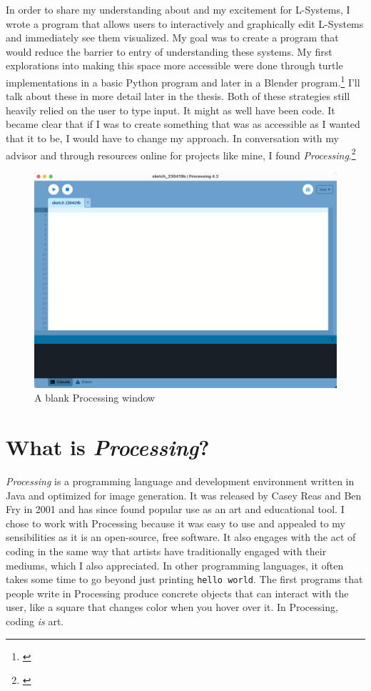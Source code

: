 \documentclass[12pt,twoside]{reedthesis}
\newcommand{\code}[1]{\texttt{#1}}
\begin{document}
	In order to share my understanding about and my excitement for L-Systems, I wrote a program that allows users to interactively and graphically edit L-Systems and immediately see them visualized. My goal was to create a program that would reduce the barrier to entry of understanding these systems. My first explorations into making this space more accessible were done through turtle implementations in a basic Python program and later in a Blender program.\footnote{\cite{Blender2018}} I'll talk about these in more detail later in the thesis. Both of these strategies still heavily relied on the user to type input. It might as well have been code. It became clear that if I was to create something that was as accessible as I wanted that it to be, I would have to change my approach. In conversation with my advisor and through resources online for projects like mine, I found \textit{Processing}.\footnote{\cite{processing2014}}
	
		
	\begin{figure}[h!]
	\centering
	\includegraphics[scale=0.3]{Images/ProcessingWindow}
	\caption{A blank Processing window}
	\label {ProcessingWindow}
	\end{figure}
	
\section{What is \textit{Processing}?}



	\textit{Processing} is a programming language and development environment written in Java and optimized for image generation. It was released by Casey Reas and Ben Fry in 2001 and has since found popular use as an art and educational tool. I chose to work with Processing because it was easy to use and appealed to my sensibilities as it is an open-source, free software. It also engages with the act of coding in the same way that artists have traditionally engaged with their mediums, which I also appreciated. In other programming languages, it often takes some time to go beyond just printing \code{hello world}. The first programs that people write in Processing produce concrete objects that can interact with the user, like a square that changes color when you hover over it. In Processing, coding \textit{is} art.
	
\end{document}
